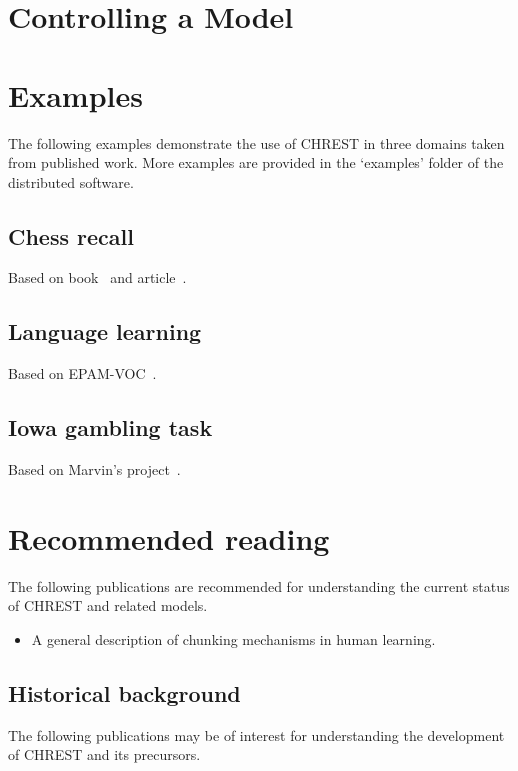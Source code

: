 \documentclass{article}
\begin{document}
\section{Controlling a Model}

\section{Examples}

The following examples demonstrate the use of CHREST in three domains taken
from published work.  More examples are provided in the `examples' folder of
the distributed software.

\subsection{Chess recall}

Based on book~\cite{deGroot96} and article~\cite{Gobet00b}.

\subsection{Language learning}

Based on EPAM-VOC~\cite{Jones08}.

\subsection{Iowa gambling task}

Based on Marvin's project~\cite{Gobet11a}.

\section{Recommended reading}

The following publications are recommended for understanding the current 
status of CHREST and related models.

\begin{itemize}
\item A general description of chunking mechanisms in human learning.\cite{Gobet01}
\end{itemize}


\subsection{Historical background}

The following publications may be of interest for understanding the development 
of CHREST and its precursors.
\end{document}
